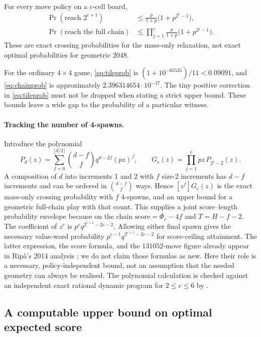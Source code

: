 \begin{theorem}\label{thm:massprob}
For every move policy on a $c$-cell board,
\begin{align}
\Pr(\text{reach }2^{c+1})
 &\le \frac{p}{1+p}\bigl(1+p^{2^c-1}\bigr),\label{eq:tileprob}\\
\Pr(\text{reach the full chain})
 &\le \prod_{j=1}^{c}\frac{p}{1+p}\bigl(1+p^{2^j-1}\bigr).
 \label{eq:chainprob}
\end{align}
These are exact crossing probabilities for the mass-only relaxation,
not exact optimal probabilities for geometric 2048.
\end{theorem}

For the ordinary $4\times4$ game, \eqref{eq:tileprob} is
$(1+10^{-65535})/11<0.09091$, and \eqref{eq:chainprob} is approximately
$2.396314654\cdot10^{-17}$. The tiny positive correction in
\eqref{eq:tileprob} must not be dropped when stating a strict upper bound.
These bounds leave a wide gap to the probability of a particular witness.

\paragraph{Tracking the number of 4-spawns.}
Introduce the polynomial
\[
P_d(z)=\sum_{f=0}^{\lfloor d/2\rfloor}
 \binom{d-f}{f}q^{d-2f}(pz)^f,
\qquad
G_c(z)=\prod_{j=1}^{c} pz\,P_{2^j-2}(z).
\]
A composition of $d$ into increments 1 and 2 with $f$ size-2 increments has $d-f$
increments and can be ordered in $\binom{d-f}{f}$ ways. Hence
$[z^f]G_c(z)$ is the exact mass-only crossing probability with $f$
4-spawns, and an upper bound for a geometric full-chain play with that
count. This supplies a joint score--length probability envelope because
on the chain $\mathrm{score}=\Phi_c-4f$ and $T=H-f-2$.
The coefficient of $z^c$ is
$p^c q^{2^{c+1}-2c-2}$. Allowing either final spawn gives the necessary
value-word probability
$p^{c-1}q^{2^{c+1}-2c-2}$ for score-ceiling attainment.
The latter expression, the score formula, and the $131052$-move figure
already appear in Rip\`a's 2014 analysis \cite{ripa2014,ripaoeis2014};
we do not claim those formulas as new. Here their role is a necessary,
policy-independent bound, not an assumption that the needed geometry
can always be realised. The polynomial calculation is checked against
an independent exact rational dynamic program for $2\le c\le6$ by
.

\subsection{A computable upper bound on optimal expected score}
\label{sec:massbellman}

